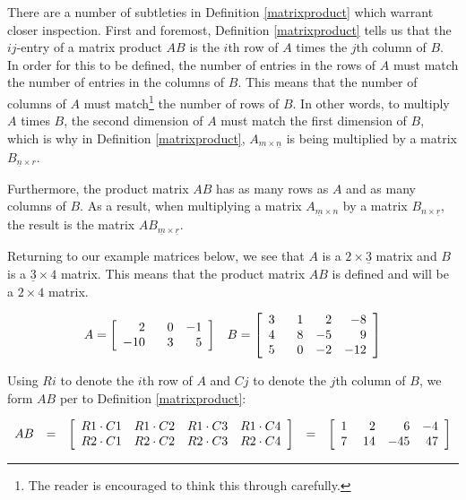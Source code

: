 \documentclass{ximera}
\begin{document}
\smallskip

There are a number of subtleties in Definition \ref{matrixproduct} which warrant closer inspection. First and foremost, Definition \ref{matrixproduct} tells us that the $ij$-entry of a matrix product $AB$ is the $i$th row of $A$ times the $j$th column of $B$.  In order for this to be defined, the number of entries in the rows of $A$ must match the number of entries in the columns of $B$. This means that the number of columns of $A$ must match\footnote{The reader is encouraged to think this through carefully.} the number of rows of $B$.  In other words, to multiply $A$ times $B$, the second dimension of $A$ must match the first dimension of $B$, which is why in Definition \ref{matrixproduct}, $A_{m \times \underline{n}}$ is being multiplied by a matrix $B_{\underline{n} \times r}$.  

Furthermore, the product matrix $AB$ has as many rows as $A$ and as many columns of $B$. As a result, when multiplying a matrix $A_{\underline{m} \times n}$ by a matrix $B_{n \times \underline{r}}$, the result is the matrix  $AB_{\underline{m} \times \underline{r}}$. 

Returning to our example matrices below, we see that $A$ is a $2 \times \underline{3}$ matrix and $B$ is a $\underline{3} \times 4$ matrix.  This means that the product matrix $AB$ is defined and will be a $2 \times 4$ matrix.

\[ \begin{array}{cc}

A = \left[\begin{array}{rrr} 2 & \hphantom{-}0 & -1 \\ -10 & 3 & 5 \\ \end{array} \right]

&

B = \left[\begin{array}{rrrr} 3 & \hphantom{-}1 & 2 & -8 \\ 4 & 8 & -5 & 9  \\ 5 & 0 & -2 & -12 \\  \end{array} \right]

\end{array}\]


Using $Ri$ to denote the $i$th row of $A$ and $Cj$ to denote the $j$th column of $B$, we form $AB$ per to Definition \ref{matrixproduct}:

\[ \begin{array}{rclcl}

AB & = & \left[\begin{array}{rrrr} R1 \cdot C1 &   R1 \cdot C2 & R1 \cdot C3 & R1 \cdot C4 \\ R2 \cdot C1 &   R2 \cdot C2 & R2 \cdot C3 & R2 \cdot C4 \\  \end{array} \right] & = & \left[\begin{array}{rrrr} 1 &  \hphantom{-}2 & 6 & -4 \\ 7 &  14 & -45 & 47 \\  \end{array} \right] \\ \end{array} \]
\end{document}

